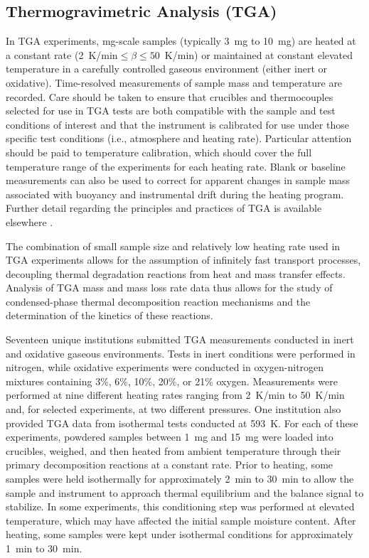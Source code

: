 \documentclass{book}
\begin{document}
\subsection{Thermogravimetric Analysis (TGA)}
In TGA experiments, mg-scale samples (typically 3~mg to 10~mg) are heated at a constant rate (2~K/min$ \le\beta\le50$~K/min) or maintained at constant elevated temperature in a carefully controlled gaseous environment (either inert or oxidative). Time-resolved measurements of sample mass and temperature are recorded. Care should be taken to ensure that crucibles and thermocouples selected for use in TGA tests are both compatible with the sample and test conditions of interest and that the instrument is calibrated for use under those specific test conditions (i.e., atmosphere and heating rate). Particular attention should be paid to temperature calibration, which should cover the full temperature range of the experiments for each heating rate. Blank or baseline measurements can also be used to correct for apparent changes in sample mass associated with buoyancy and instrumental drift during the heating program. Further detail regarding the principles and practices of TGA is available elsewhere \cite{coats1963thermogravimetric}.

The combination of small sample size and relatively low heating rate used in TGA experiments allows for the assumption of infinitely fast transport processes, decoupling thermal degradation reactions from heat and mass transfer effects. Analysis of TGA mass and mass loss rate data thus allows for the study of condensed-phase thermal decomposition reaction mechanisms and the determination of the kinetics of these reactions.

Seventeen unique institutions submitted TGA measurements conducted in inert and oxidative gaseous environments. Tests in inert conditions were performed in nitrogen, while oxidative experiments were conducted in oxygen-nitrogen mixtures containing 3\%, 6\%, 10\%, 20\%, or 21\% oxygen. Measurements were performed at nine different heating rates ranging from 2~K/min to 50~K/min and, for selected experiments, at two different pressures. One institution also provided TGA data from isothermal tests conducted at 593~K. For each of these experiments, powdered samples between 1~mg and 15~mg were loaded into crucibles, weighed, and then heated from ambient temperature through their primary decomposition reactions at a constant rate. Prior to heating, some samples were held isothermally for approximately 2~min to 30~min to allow the sample and instrument to approach thermal equilibrium and the balance signal to stabilize. In some experiments, this conditioning step was performed at elevated temperature, which may have affected the initial sample moisture content. After heating, some samples were kept under isothermal conditions for approximately 1~min to 30~min.
\end{document}
